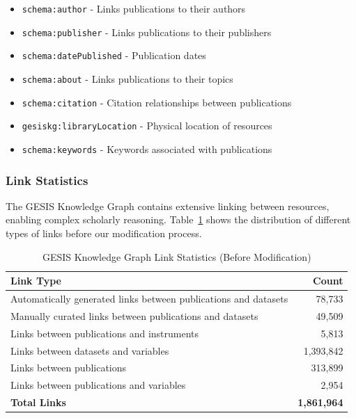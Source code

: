 \begin{itemize}
    \item \texttt{schema:author} - Links publications to their authors
    \item \texttt{schema:publisher} - Links publications to their publishers
    \item \texttt{schema:datePublished} - Publication dates
    \item \texttt{schema:about} - Links publications to their topics
    \item \texttt{schema:citation} - Citation relationships between publications
    \item \texttt{gesiskg:libraryLocation} - Physical location of resources
    \item \texttt{schema:keywords} - Keywords associated with publications
\end{itemize}

\subsubsection{Link Statistics}
The GESIS Knowledge Graph contains extensive linking between resources, enabling complex scholarly reasoning. Table~\ref{table-gesis-links} shows the distribution of different types of links before our modification process.

\begin{table}[htbp]
\centering
\renewcommand{\arraystretch}{1.15}
\setlength{\tabcolsep}{12pt}
\begin{tabular}{| l | r |}
\hline
\textbf{Link Type} & \textbf{Count} \\
\hline
Automatically generated links between publications and datasets & 78,733 \\
Manually curated links between publications and datasets & 49,509 \\
Links between publications and instruments & 5,813 \\
Links between datasets and variables & 1,393,842 \\
Links between publications & 313,899 \\
Links between publications and variables & 2,954 \\
\hline
\textbf{Total Links} & \textbf{1,861,964} \\
\hline
\end{tabular}
\caption{GESIS Knowledge Graph Link Statistics (Before Modification)}
\label{table-gesis-links}
\end{table}


